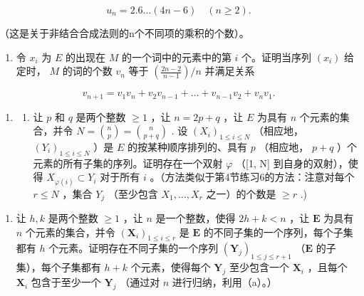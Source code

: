 \[
u _ {n} = 2. 6 \dots (4 n - 6) \quad (n \geqslant 2).
\]

（这是关于非结合合成法则的n个不同项的乘积的个数）。

\begin{enumerate}
\def\labelenumi{(\alph{enumi})}
\setcounter{enumi}{1}
\tightlist
\item
  令 \(x_{i}\) 为 \(E\) 的出现在 \(M\) 的一个词中的元素中的第 \(i\) 个。证明当序列 \((x_{i})\) 给定时， \(M\) 的词的个数 \(v_{n}\) 等于 \((\frac{2n-2}{n-1})/n\) 并满足关系
\end{enumerate}

\[
v _ {n + 1} = v _ {1} v _ {n} + v _ {2} v _ {n - 1} + \dots + v _ {n - 1} v _ {2} + v _ {n} v _ {1}.
\]

\begin{enumerate}
\def\labelenumi{\arabic{enumi}.}
\setcounter{enumi}{11}
\tightlist
\item
  \begin{enumerate}
  \def\labelenumii{(\alph{enumii})}
  \tightlist
  \item
    让 \(p\) 和 \(q\) 是两个整数 \(\geqslant 1\) ，让 \(n = 2p + q\) ，让 \(E\) 为具有 \(n\) 个元素的集合，并令 \(N = \binom{n}{p} = \binom{n}{p + q}\) . 设 \((X_i)_{1 \leqslant i \leqslant N}\) （相应地， \((Y_i)_{1 \leqslant i \leqslant N}\) ）是 \(E\) 的按某种顺序排列的、具有 \(p\) （相应地， \(p + q\) ）个元素的所有子集的序列。证明存在一个双射 \(\varphi\) （{[}1, N{]} 到自身的双射），使得 \(X_{\varphi(i)} \subset Y_i\) 对于所有 \(i\) 。（方法类似于第4节练习6的方法：注意对每个 \(r \leqslant N\) ，集合 \(Y_j\) （至少包含 \(X_1, \ldots, X_r\) 之一）的个数是 \(\geqslant r\) .)
  \end{enumerate}
\end{enumerate}

\begin{enumerate}
\def\labelenumi{(\alph{enumi})}
\setcounter{enumi}{1}
\tightlist
\item
  让 \(h, k\) 是两个整数 \(\geqslant 1\) ，让 \(n\) 是一个整数，使得 \(2h + k < n\) ，让 \(\mathbf{E}\) 为具有 \(n\) 个元素的集合，并令 \((\mathbf{X}_i)_{1 \leqslant i \leqslant r}\) 是 \(\mathbf{E}\) 的不同子集的一个序列，每个子集都有 \(h\) 个元素。证明存在不同子集的一个序列 \((\mathbf{Y}_j)_{1 \leqslant j \leqslant r+1}\) （\(\mathbf{E}\) 的子集），每个子集都有 \(h + k\) 个元素，使得每个 \(\mathbf{Y}_j\) 至少包含一个 \(\mathbf{X}_i\) ，且每个 \(\mathbf{X}_i\) 包含于至少一个 \(\mathbf{Y}_j\) （通过对 \(n\) 进行归纳，利用（a）。）
\end{enumerate}

